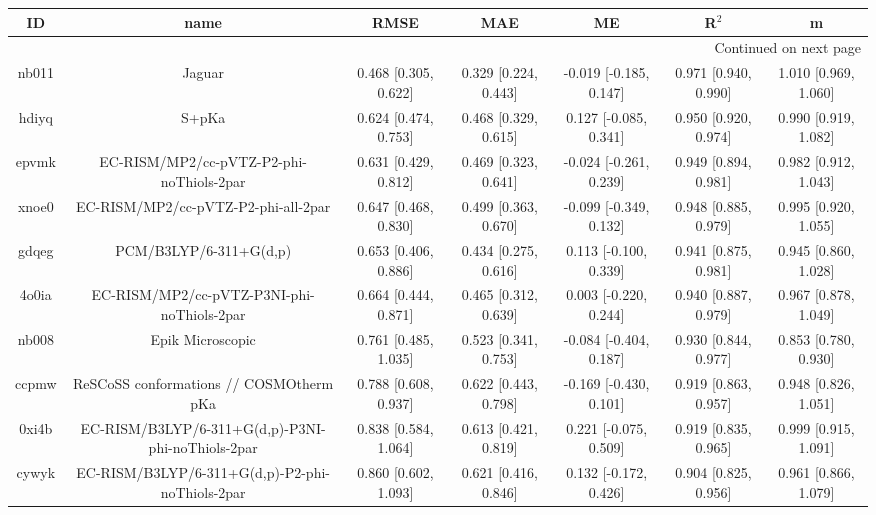 \documentclass{article}
\begin{document}
\begin{center}
\begin{longtable}{|ccccccc|}
\toprule
    ID &                                               name &                  RMSE &                   MAE &                      ME &                 R$^2$ &                      m \\
\midrule
\endhead
\midrule
\multicolumn{7}{r}{{Continued on next page}} \\
\midrule
\endfoot

\bottomrule
\endlastfoot
 nb011 &                                             Jaguar &  0.468 [0.305, 0.622] &  0.329 [0.224, 0.443] &  -0.019 [-0.185, 0.147] &  0.971 [0.940, 0.990] &   1.010 [0.969, 1.060] \\
 hdiyq &                                              S+pKa &  0.624 [0.474, 0.753] &  0.468 [0.329, 0.615] &   0.127 [-0.085, 0.341] &  0.950 [0.920, 0.974] &   0.990 [0.919, 1.082] \\
 epvmk &           EC-RISM/MP2/cc-pVTZ-P2-phi-noThiols-2par &  0.631 [0.429, 0.812] &  0.469 [0.323, 0.641] &  -0.024 [-0.261, 0.239] &  0.949 [0.894, 0.981] &   0.982 [0.912, 1.043] \\
 xnoe0 &                EC-RISM/MP2/cc-pVTZ-P2-phi-all-2par &  0.647 [0.468, 0.830] &  0.499 [0.363, 0.670] &  -0.099 [-0.349, 0.132] &  0.948 [0.885, 0.979] &   0.995 [0.920, 1.055] \\
 gdqeg &                             PCM/B3LYP/6-311+G(d,p) &  0.653 [0.406, 0.886] &  0.434 [0.275, 0.616] &   0.113 [-0.100, 0.339] &  0.941 [0.875, 0.981] &   0.945 [0.860, 1.028] \\
 4o0ia &         EC-RISM/MP2/cc-pVTZ-P3NI-phi-noThiols-2par &  0.664 [0.444, 0.871] &  0.465 [0.312, 0.639] &   0.003 [-0.220, 0.244] &  0.940 [0.887, 0.979] &   0.967 [0.878, 1.049] \\
 nb008 &                                   Epik Microscopic &  0.761 [0.485, 1.035] &  0.523 [0.341, 0.753] &  -0.084 [-0.404, 0.187] &  0.930 [0.844, 0.977] &   0.853 [0.780, 0.930] \\
 ccpmw &            ReSCoSS conformations // COSMOtherm pKa &  0.788 [0.608, 0.937] &  0.622 [0.443, 0.798] &  -0.169 [-0.430, 0.101] &  0.919 [0.863, 0.957] &   0.948 [0.826, 1.051] \\
 0xi4b &  EC-RISM/B3LYP/6-311+G(d,p)-P3NI-phi-noThiols-2par &  0.838 [0.584, 1.064] &  0.613 [0.421, 0.819] &   0.221 [-0.075, 0.509] &  0.919 [0.835, 0.965] &   0.999 [0.915, 1.091] \\
 cywyk &    EC-RISM/B3LYP/6-311+G(d,p)-P2-phi-noThiols-2par &  0.860 [0.602, 1.093] &  0.621 [0.416, 0.846] &   0.132 [-0.172, 0.426] &  0.904 [0.825, 0.956] &   0.961 [0.866, 1.079] \\

\end{longtable}
\end{center}
\end{document}
